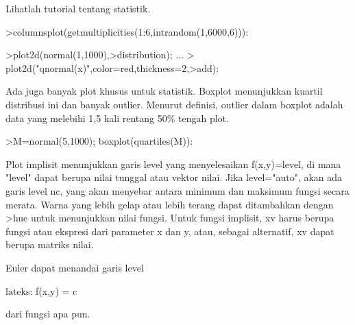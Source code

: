 \documentclass[a4paper,10pt]{article}
\begin{document}
\begin{eulernotebook}
\begin{eulercomment}
\begin{eulercomment}
\begin{eulercomment}
\begin{eulercomment}
\begin{eulercomment}
\begin{eulercomment}
\begin{eulercomment}
\begin{eulercomment}
\begin{eulercomment}
\begin{eulercomment}
\begin{eulercomment}
\begin{eulercomment}
\begin{eulercomment}
\begin{eulercomment}
\begin{eulercomment}
Lihatlah tutorial tentang statistik.
\end{eulercomment}
\begin{eulerprompt}
>columnsplot(getmultiplicities(1:6,intrandom(1,6000,6))):
\end{eulerprompt}
\begin{eulerprompt}
>plot2d(normal(1,1000),>distribution); ...
>  plot2d("qnormal(x)",color=red,thickness=2,>add):
\end{eulerprompt}
\begin{eulercomment}
Ada juga banyak plot khusus untuk statistik. Boxplot menunjukkan
kuartil distribusi ini dan banyak outlier. Menurut definisi, outlier
dalam boxplot adalah data yang melebihi 1,5 kali rentang 50\% tengah
plot.
\end{eulercomment}
\begin{eulerprompt}
>M=normal(5,1000); boxplot(quartiles(M)):
\end{eulerprompt}
\begin{eulercomment}
Plot implisit menunjukkan garis level yang menyelesaikan f(x,y)=level,
di mana "level" dapat berupa nilai tunggal atau vektor nilai. Jika
level="auto", akan ada garis level nc, yang akan menyebar antara
minimum dan maksimum fungsi secara merata. Warna yang lebih gelap atau
lebih terang dapat ditambahkan dengan \textgreater{}hue untuk menunjukkan nilai
fungsi. Untuk fungsi implisit, xv harus berupa fungsi atau ekspresi
dari parameter x dan y, atau, sebagai alternatif, xv dapat berupa
matriks nilai.

Euler dapat menandai garis level

lateks: f(x,y) = c

dari fungsi apa pun.


\end{eulercomment}
\end{eulercomment}
\end{eulercomment}
\end{eulercomment}
\end{eulercomment}
\end{eulercomment}
\end{eulercomment}
\end{eulercomment}
\end{eulercomment}
\end{eulercomment}
\end{eulercomment}
\end{eulercomment}
\end{eulercomment}
\end{eulercomment}
\end{eulercomment}
\end{eulernotebook}
\end{document}
